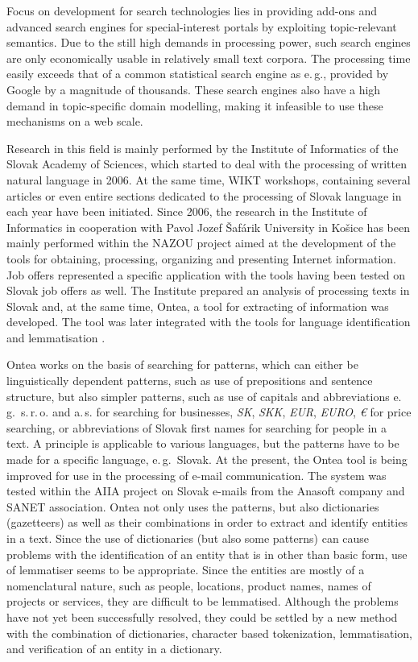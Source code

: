 \begin{multicols}{2}
Focus on development for search technologies lies in providing add-ons and advanced search engines for special-interest portals by exploiting topic-relevant semantics. Due to the still high demands in processing power, such search engines are only economically usable in relatively small text corpora. The processing time easily exceeds that of a common statistical search engine as e.\,g., provided by Google by a magnitude of thousands. These search engines also have a high demand in topic-specific domain modelling, making it infeasible to use these mechanisms on a web scale.

Research in this field is mainly performed by the Institute of Informatics of the Slovak Academy of Sciences, which started to deal with the processing of written natural language in 2006. At the same time, WIKT\cite{f26} workshops, containing several articles or even entire sections dedicated to the processing of Slovak language in each year have been initiated. Since 2006, the research in the Institute of Informatics in cooperation with Pavol Jozef Šafárik University in Košice has been mainly performed within the NAZOU\cite{f27} project aimed at the development of the tools for obtaining, processing, organizing and presenting Internet information. Job offers represented a specific application with the tools having been tested on Slovak job offers as well.  The Institute prepared an analysis of processing texts in Slovak \cite{laclavik2007a} and, at the same time, Ontea\cite{f28}, a tool for extracting of information \cite{laclavik2007b,laclavik2009} was developed. The tool was later integrated with the tools for language identification \cite{vojtek2006} and lemmatisation \cite{krajci2007}.

Ontea works on the basis of searching for patterns, which can either be linguistically dependent patterns, such as use of prepositions and sentence structure, but also simpler patterns, such as use of capitals and abbreviations e.\,g.~s.\,r.\,o. and a.\,s. for searching for businesses, \emph{SK}, \emph{SKK}, \emph{EUR}, \emph{EURO}, \emph{€} for price searching, or abbreviations of Slovak first names for searching for people in a text. A principle is applicable to various languages, but the patterns have to be made for a specific language, e.\,g.~Slovak.  At the present, the Ontea tool is being improved for use in the processing of e-mail communication. The system was tested within the AIIA project\cite{f29} \cite{laclavik2010} on Slovak e-mails from the Anasoft company and SANET association. Ontea not only uses the patterns, but also dictionaries (gazetteers) as well as their combinations in order to extract and identify entities in a text. Since the use of dictionaries (but also some patterns) can cause problems with the identification of an entity that is in other than basic form, use of lemmatiser seems to be appropriate. Since the entities are mostly of a nomenclatural nature, such as people, locations, product names, names of projects or services, they are difficult to be lemmatised. Although the problems have not yet been successfully resolved, they could be settled by a new method with the combination of dictionaries, character based tokenization, lemmatisation, and verification of an entity in a dictionary.


\end{multicols}
